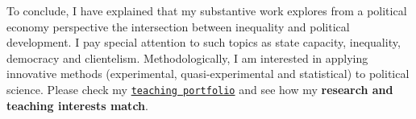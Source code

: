 \documentclass[10pt,stdletter,dateno,sigleft]{newlfm} %
\begin{document}
\begin{newlfm}
To conclude, I have explained that my substantive work explores from a political economy perspective the intersection between inequality and political development. I pay special attention to such topics as state capacity, inequality, democracy and clientelism. Methodologically, I am interested in applying innovative methods (experimental, quasi-experimental and statistical) to political science. Please check my \href{http://www.hectorbahamonde.com/teaching/}{\texttt{teaching portfolio}} and see how my {\bf research and teaching interests match}. 

{\unskip}


\vspace{-10cm}



\end{newlfm}
\end{document}
